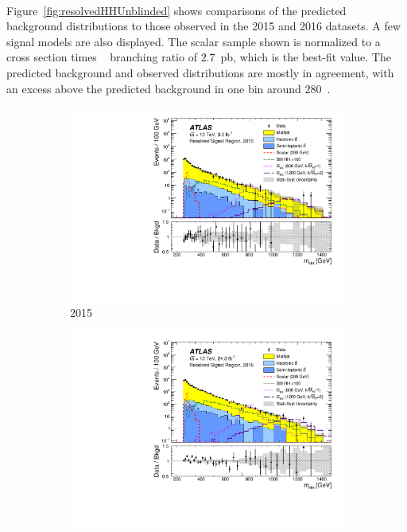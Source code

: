 \paragraph{}
Figure~\ref{fig:resolvedHHUnblinded} shows comparisons of the predicted \mfourj~ background distributions to those observed in the 2015 and 2016 datasets. 
A few signal models are also displayed. 
The scalar sample shown is normalized to a cross section times \hbb~ branching ratio of $2.7$~pb, which is the best-fit value. 
The predicted background and observed distributions are mostly in agreement, with an excess above the predicted background in one bin around $280$~\GeV.


\begin{figure}[htb!]
\begin{center}
    \captionsetup{justification=centering}
    \hspace{-2cm}
    \begin{subfigure}[b]{0.39\textwidth}
        \includegraphics[width=\textwidth,angle=-90]{figures/resolved/results/data_2015_hh_v_logy.pdf}
        \caption{2015}
        \label{fig:resolvedHHUnblinded-2015}
    \end{subfigure}
    \quad \quad \quad
    \begin{subfigure}[b]{0.39\textwidth}
        \includegraphics[width=\textwidth,angle=-90]{figures/resolved/results/data_2016_hh_v_logy.pdf}

\end{subfigure}
\end{center}
\end{figure}
